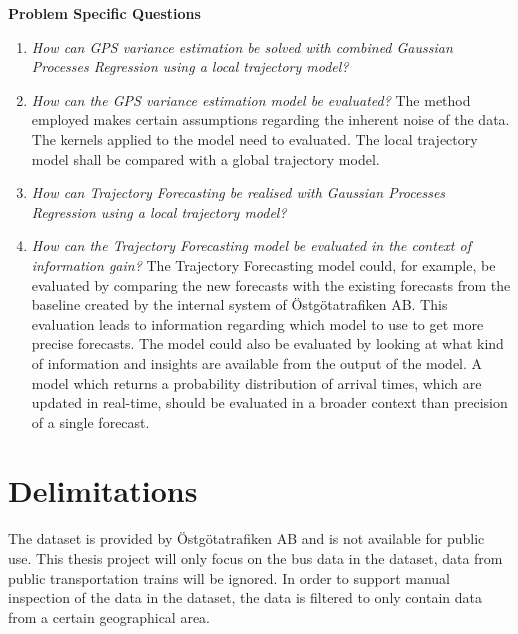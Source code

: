 \begin{description}
  \item \textbf{Problem Specific Questions}
  \begin{enumerate}
    \item \textit{How can GPS variance estimation be solved with combined Gaussian Processes Regression using a local trajectory model?} \newline
    \item \textit{How can the GPS variance estimation model be evaluated?} \newline
    The method employed makes certain assumptions regarding the inherent noise of the data.
    The kernels applied to the model need to evaluated.
    The local trajectory model shall be compared with a global trajectory model.
    \item \textit{How can Trajectory Forecasting be realised with Gaussian Processes Regression using a local trajectory model?} \newline
    \item \textit{How can the Trajectory Forecasting model be evaluated in the context of information gain?} \newline
    The Trajectory Forecasting model could, for example, be evaluated by comparing the new forecasts with the existing forecasts from the baseline created by the internal system of Östgötatrafiken AB.
    This evaluation leads to information regarding which model to use to get more precise forecasts.
    The model could also be evaluated by looking at what kind of information and insights are available from the output of the model.
    A model which returns a probability distribution of arrival times, which are updated in real-time, should be evaluated in a broader context than precision of a single forecast.
  \end{enumerate}
\end{description}

\section{Delimitations}
\label{sec:delimitations}
The dataset is provided by Östgötatrafiken AB and is not available for public use.
This thesis project will only focus on the bus data in the dataset, data from public transportation trains will be ignored.
In order to support manual inspection of the data in the dataset, the data is filtered to only contain data from a certain geographical area.

